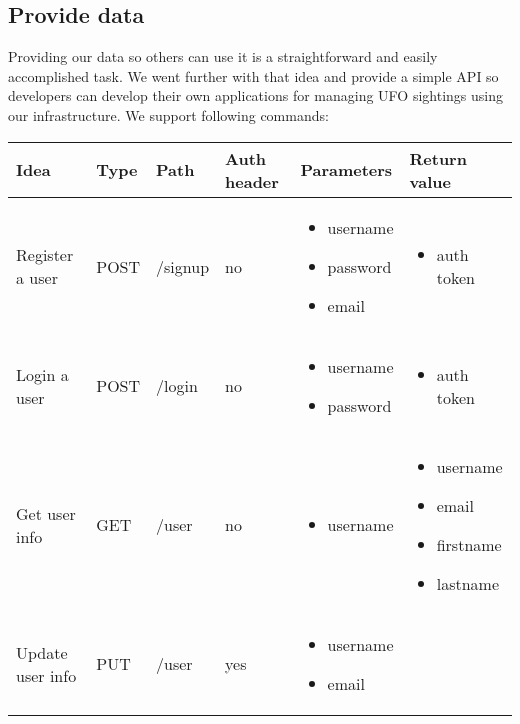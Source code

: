 \documentclass{article}
\begin{document}
\subsection{Provide data}
Providing our data so others can use it is a straightforward and easily accomplished task. We went further with that idea and provide a simple API so developers can develop their own applications for managing UFO sightings using our infrastructure. We support following commands:
\begin{center}
    \begin{longtable}{ |  l  |  l  |  l  |  p{2cm}  |  p{2.6cm}  |  p{3cm}  | }
    \hline
    Idea & Type & Path & Auth header & Parameters & Return value \\ \hline
    Register a user & POST & /signup & no & \begin{itemize}
    \item username
    \item password
    \item email
\end{itemize} & \begin{itemize}
\item auth token
\end{itemize} \\ \hline
    Login a user & POST & /login & no & \begin{itemize}
    \item username
    \item password
\end{itemize} & \begin{itemize}
\item auth token
\end{itemize} \\ \hline
    Get user info & GET & /user & no & \begin{itemize}
    \item username
\end{itemize}     & \begin{itemize}
\item username
\item email
\item firstname
\item lastname
\end{itemize} \\ \hline
    Update user info & PUT & /user & yes & \begin{itemize}
    \item username
    \item email

\end{itemize}
\end{longtable}
\end{center}
\end{document}
